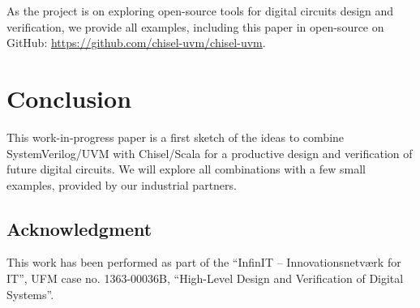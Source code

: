 \documentclass[conference]{IEEEtran}
\begin{document}
As the project is on exploring open-source tools for digital circuits design
and verification, we provide all examples, including this paper in open-source
on GitHub: \url{https://github.com/chisel-uvm/chisel-uvm}.


\section{Conclusion}
\label{sec:conclusion}

This work-in-progress paper is a first sketch of the ideas to combine SystemVerilog/UVM
with Chisel/Scala for a productive design and verification of future digital circuits.
We will explore all combinations with a few small examples, provided by our industrial
partners.


\subsection*{Acknowledgment}

This work has been performed as part of the
``InfinIT -- Innovationsnetv{\ae}rk for IT'', UFM case no. 1363-00036B,
``High-Level Design and Verification of Digital Systems''.







\end{document}
